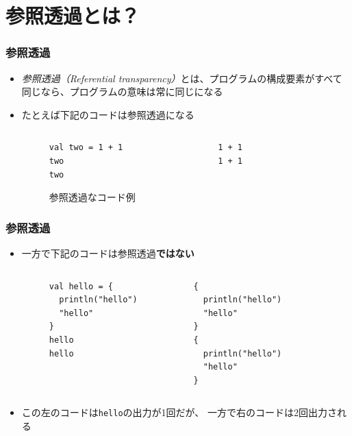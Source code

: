 \section{参照透過とは？}

\begin{frame}[fragile]
  \frametitle{参照透過}

  \begin{itemize}
    \item<+-> \emph{参照透過（Referential transparency）}とは、プログラムの構成要素がすべて同じなら、プログラムの意味は常に同じになる

    \item<+-> たとえば下記のコードは参照透過になる
    \begin{figure}[h]
      \begin{columns}
        \begin{column}{0.4\textwidth}
\begin{lstlisting}[style=scala]
val two = 1 + 1
two
two
\end{lstlisting}
      \end{column}
      \begin{column}{0.4\textwidth}
\begin{lstlisting}[style=scala]
1 + 1
1 + 1
\end{lstlisting}
        \end{column}
      \end{columns}
      \label{fig:lst_referential_transparency}
      \caption{参照透過なコード例}
    \end{figure}

  \end{itemize}
\end{frame}

\begin{frame}[fragile]
  \frametitle{参照透過}

  \begin{itemize}
    \item<+-> 一方で下記のコードは参照透過\textbf{ではない}
    \begin{figure}[h]
      \begin{columns}
        \begin{column}{0.4\textwidth}
\begin{lstlisting}[style=scala]
val hello = {
  println("hello")
  "hello"
}
hello
hello
\end{lstlisting}
        \end{column}
        \begin{column}{0.4\textwidth}
\begin{lstlisting}[style=scala]
{
  println("hello")
  "hello"
}
{
  println("hello")
  "hello"
}
\end{lstlisting}
        \end{column}
      \end{columns}
    \end{figure}

    \item<+-> この左のコードは\lstinline|hello|の出力が1回だが、
    一方で右のコードは2回出力される
  \end{itemize}
\end{frame}

